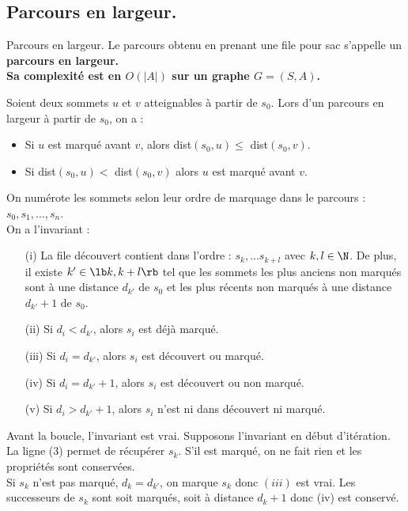 \documentclass[french, 11pt]{article}
\begin{document}
\subsection{Parcours en largeur.}

\begin{defi}{Parcours en largeur.}{}
    Le parcours obtenu en prenant une file pour sac s'appelle un \bf{parcours en largeur}.\\
    Sa complexité est en $O(|A|)$ sur un graphe $G=(S,A)$.
\end{defi}

\begin{prop}{}{}
    Soient deux sommets $u$ et $v$ atteignables à partir de $s_0$. Lors d'un parcours en largeur à partir de $s_0$, on a :
    \begin{itemize}[topsep=0pt,itemsep=-0.9 ex]
        \item Si $u$ est marqué avant $v$, alors dist$(s_0,u)\leq$ dist$(s_0,v)$.
        \item Si dist$(s_0,u)<$ dist$(s_0,v)$ alors $u$ est marqué avant $v$.
    \end{itemize}
    \tcblower
    On numérote les sommets selon leur ordre de marquage dans le parcours : $s_0,s_1,...,s_n$.\\
    On a l'invariant :
    \begin{itemize}[topsep=0pt,itemsep=-0.2 ex]
        \item[(i)] La file découvert contient dans l'ordre : $s_k,...s_{k+l}$ avec $k,l\in\N$. De plus, il existe $k'\in\lb k,k+l\rb$ tel que les sommets les plus anciens non marqués sont à une distance $d_{k'}$ de $s_0$ et les plus récents non marqués à une distance $d_{k'}+1$ de $s_0$.
        \item[(ii)] Si $d_i<d_{k'}$, alors $s_i$ est déjà marqué.
        \item[(iii)] Si $d_i=d_{k'}$, alors $s_i$ est découvert ou marqué.
        \item[(iv)] Si $d_i=d_{k'}+1$, alors $s_i$ est découvert ou non marqué.
        \item[(v)] Si $d_i>d_{k'}+1$, alors $s_i$ n'est ni dans découvert ni marqué. 
    \end{itemize}
    Avant la boucle, l'invariant est vrai. Supposons l'invariant en début d'itération.\\
    La ligne (3) permet de récupérer $s_k$. S'il est marqué, on ne fait rien et les propriétés sont conservées.\\
    Si $s_k$ n'est pas marqué, $d_k=d_{k'}$, on marque $s_k$ donc $(iii)$ est vrai. Les successeurs de $s_k$ sont soit marqués, soit à distance $d_k+1$ donc (iv) est conservé.
\end{prop}
\end{document}
